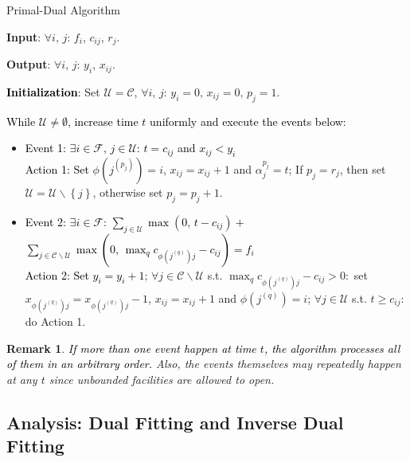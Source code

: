 \documentclass[10pt]{llncs}
\newtheorem{rem}{Remark}
\begin{document}
\begin{algorithm}[H]
{\small \caption{Primal-Dual Algorithm}
}{\small \par}

\textbf{Input}: $\forall i,\, j:\, f_{i}$, $c_{ij}$, $r_{j}$.

\textbf{Output}: $\forall i,\, j:\, y_{i}$, $x_{ij}$.

\textbf{\textcolor{black}{Initialization}}\textcolor{black}{: }Set
$\mathcal{U}=\mathcal{C}$, $\forall i,\, j:\, y_{i}=0,\, x_{ij}=0,\, p_{j}=1$.

\medskip{}


\textcolor{black}{While $\mathcal{U}\neq\emptyset$, increase time
$t$ uniformly and execute the events below:} 
\begin{itemize}
\item \textcolor{black}{Event 1: $\exists i\in\mathcal{F},\, j\in\mathcal{U}$:
$t=c_{ij}$ and $x_{ij}<y_{i}$ }\\
 \textcolor{black}{Action 1: Set }$\phi\left(j^{\left(p_{j}\right)}\right)=i$,
$x_{ij}=x_{ij}+1$ and $\alpha_{j}^{p_{j}}=t$; If $p_{j}=r_{j}$,
then set\textbf{ $\mathcal{U}=\mathcal{U}\backslash\left\{ j\right\} $},
otherwise set $p_{j}=p_{j}+1$.\textcolor{black}{{} }\smallskip{}

\item \textcolor{black}{Event 2: $\exists i\in\mathcal{F}$: $\sum_{j\in\mathcal{U}}\max\left(0,\, t-c_{ij}\right)+$$\sum_{j\in\mathcal{C}\backslash\mathcal{U}}\max\left(0,\,\max_{q}c_{\phi\left(j^{\left(q\right)}\right)j}-c_{ij}\right)=f_{i}$}\\
 \textcolor{black}{Action 2: Set $y_{i}=y_{i}+1$}; $\forall j\in\mathcal{C}\backslash\mathcal{U}$
s.t. $\max_{q}c_{\phi\left(j^{\left(q\right)}\right)j}-c_{ij}>0:$
set $x_{\phi\left(j^{\left(q\right)}\right)j}=x_{\phi\left(j^{\left(q\right)}\right)j}-1$,
$x_{ij}=x_{ij}+1$ and $\phi\left(j^{\left(q\right)}\right)=i$; $\forall j\in\mathcal{\mathcal{U}}$
s.t. $t\geq c_{ij}:$ do Action 1.
\end{itemize}
\begin{rem} \textcolor{black}{If more than one event happen at time
$t$, the algorithm processes all of them in an arbitrary order.}
Also, the events themselves may repeatedly happen at any $t$ since
unbounded facilities are allowed to open.\end{rem}\end{algorithm}



\subsection{Analysis: Dual Fitting and Inverse Dual Fitting }
\end{document}
